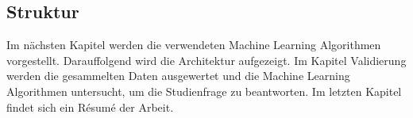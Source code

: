 \subsection{Struktur}
Im nächsten Kapitel werden die verwendeten Machine Learning Algorithmen vorgestellt. Darauffolgend wird die Architektur aufgezeigt. Im Kapitel Validierung werden die gesammelten Daten ausgewertet und die Machine Learning Algorithmen untersucht, um die Studienfrage zu beantworten. Im letzten Kapitel findet sich ein Résumé der Arbeit.